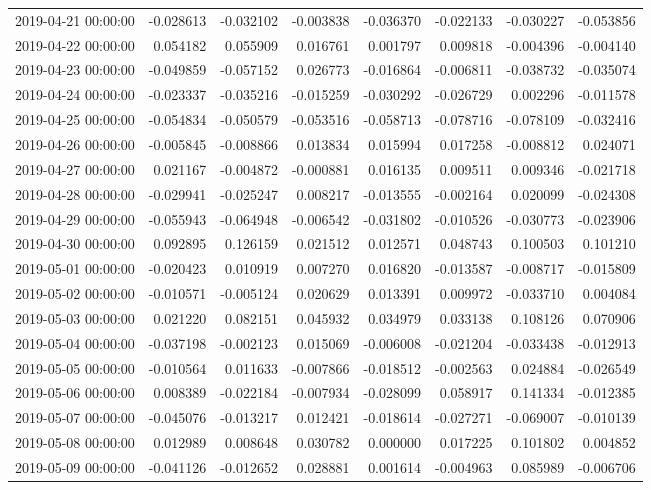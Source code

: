 \begin{tabular}{lrrrrrrr}
2019-04-21 00:00:00 & -0.028613 & -0.032102 & -0.003838 & -0.036370 & -0.022133 & -0.030227 & -0.053856 \\
2019-04-22 00:00:00 & 0.054182 & 0.055909 & 0.016761 & 0.001797 & 0.009818 & -0.004396 & -0.004140 \\
2019-04-23 00:00:00 & -0.049859 & -0.057152 & 0.026773 & -0.016864 & -0.006811 & -0.038732 & -0.035074 \\
2019-04-24 00:00:00 & -0.023337 & -0.035216 & -0.015259 & -0.030292 & -0.026729 & 0.002296 & -0.011578 \\
2019-04-25 00:00:00 & -0.054834 & -0.050579 & -0.053516 & -0.058713 & -0.078716 & -0.078109 & -0.032416 \\
2019-04-26 00:00:00 & -0.005845 & -0.008866 & 0.013834 & 0.015994 & 0.017258 & -0.008812 & 0.024071 \\
2019-04-27 00:00:00 & 0.021167 & -0.004872 & -0.000881 & 0.016135 & 0.009511 & 0.009346 & -0.021718 \\
2019-04-28 00:00:00 & -0.029941 & -0.025247 & 0.008217 & -0.013555 & -0.002164 & 0.020099 & -0.024308 \\
2019-04-29 00:00:00 & -0.055943 & -0.064948 & -0.006542 & -0.031802 & -0.010526 & -0.030773 & -0.023906 \\
2019-04-30 00:00:00 & 0.092895 & 0.126159 & 0.021512 & 0.012571 & 0.048743 & 0.100503 & 0.101210 \\
2019-05-01 00:00:00 & -0.020423 & 0.010919 & 0.007270 & 0.016820 & -0.013587 & -0.008717 & -0.015809 \\
2019-05-02 00:00:00 & -0.010571 & -0.005124 & 0.020629 & 0.013391 & 0.009972 & -0.033710 & 0.004084 \\
2019-05-03 00:00:00 & 0.021220 & 0.082151 & 0.045932 & 0.034979 & 0.033138 & 0.108126 & 0.070906 \\
2019-05-04 00:00:00 & -0.037198 & -0.002123 & 0.015069 & -0.006008 & -0.021204 & -0.033438 & -0.012913 \\
2019-05-05 00:00:00 & -0.010564 & 0.011633 & -0.007866 & -0.018512 & -0.002563 & 0.024884 & -0.026549 \\
2019-05-06 00:00:00 & 0.008389 & -0.022184 & -0.007934 & -0.028099 & 0.058917 & 0.141334 & -0.012385 \\
2019-05-07 00:00:00 & -0.045076 & -0.013217 & 0.012421 & -0.018614 & -0.027271 & -0.069007 & -0.010139 \\
2019-05-08 00:00:00 & 0.012989 & 0.008648 & 0.030782 & 0.000000 & 0.017225 & 0.101802 & 0.004852 \\
2019-05-09 00:00:00 & -0.041126 & -0.012652 & 0.028881 & 0.001614 & -0.004963 & 0.085989 & -0.006706 \\

\end{tabular}
